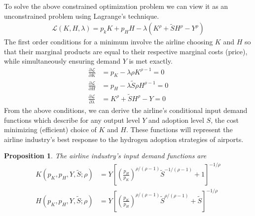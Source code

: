 \documentclass[a4paper, 14pt]{article}
\newtheorem{prop}{Proposition}
\begin{document}
To solve the above constrained optimization problem we can view it as an unconstrained problem using Lagrange's technique.
\begin{align}
    \mathcal{L}(K,H,\lambda) = p_k K + p_H H - \lambda(K^{\rho} + \tilde{S} H^{\rho} - Y^{\rho}) \nonumber
\end{align}
The first order conditions for a minimum involve the airline choosing $K$ and $H$ so that their marginal products are equal to their respective marginal costs (price), while simultaneously ensuring demand $Y$ is met exactly.
\begin{align}
    \frac{\partial \mathcal{L}}{\partial K} &= p_K - \lambda \rho K^{\rho-1} = 0 \nonumber \\
    \frac{\partial \mathcal{L}}{\partial H} &= p_H - \lambda \tilde{S}\rho H^{\rho-1} = 0 \nonumber \\
    \frac{\partial \mathcal{L}}{\partial \lambda} &= K^{\rho} + \tilde{S}H^{\rho} - Y = 0 \nonumber
\end{align}
From the above conditions, we can derive the airline's conditional input demand functions which describe for any output level $Y$ and adoption level $S$, the cost minimizing (efficient) choice of $K$ and $H$.
These functions will represent the airline industry's best response to the hydrogen adoption strategies of airports.
\begin{prop}
    The airline industry's input demand functions are
    \begin{align}
        K(p_K,p_H,Y,\tilde{S};\rho) &= Y \left[ \left(\frac{p_H}{p_K}\right)^{\rho/(\rho-1)}\tilde{S}^{-1/(\rho-1)} + 1 \right]^{-1/\rho} \label{eq:K_demand} \\
        H(p_K,p_H,Y,\tilde{S};\rho) &= Y \left[ \left(\frac{p_K}{p_H}\right)^{\rho/(\rho-1)}\tilde{S}^{\rho/(\rho-1)} + \tilde{S} \right]^{-1/\rho} \label{eq:H_demand}
    \end{align}
\end{prop}
\end{document}
